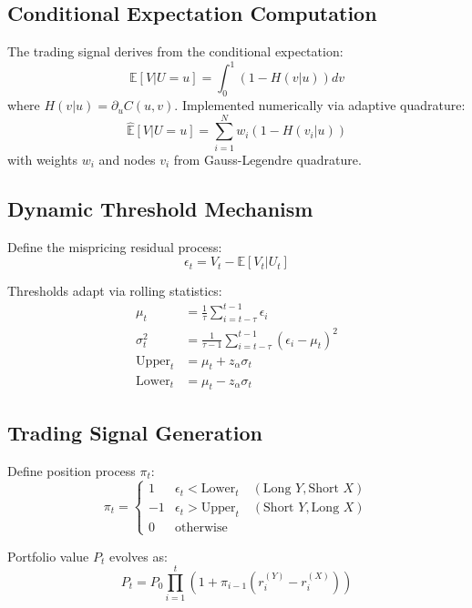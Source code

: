 \subsection{Conditional Expectation Computation}
The trading signal derives from the conditional expectation:
\begin{equation}
    \mathbb{E}[V|U=u] = \int_0^1 (1 - H(v|u))dv
\end{equation}
where $H(v|u)=\partial_u C(u,v)$. Implemented numerically via adaptive quadrature:
\begin{equation}
    \hat{\mathbb{E}}[V|U=u] = \sum_{i=1}^N w_i(1 - H(v_i|u))
\end{equation}
with weights $w_i$ and nodes $v_i$ from Gauss-Legendre quadrature.

\subsection{Dynamic Threshold Mechanism}
Define the mispricing residual process:
\begin{equation}
    \epsilon_t = V_t - \mathbb{E}[V_t|U_t]
\end{equation}

Thresholds adapt via rolling statistics:
\begin{align}
    \mu_t &= \frac{1}{\tau}\sum_{i=t-\tau}^{t-1} \epsilon_i \\
    \sigma_t^2 &= \frac{1}{\tau-1}\sum_{i=t-\tau}^{t-1} (\epsilon_i - \mu_t)^2 \\
    \text{Upper}_t &= \mu_t + z_\alpha\sigma_t \\
    \text{Lower}_t &= \mu_t - z_\alpha\sigma_t
\end{align}

\subsection{Trading Signal Generation}
Define position process $\pi_t$:
\begin{equation}
    \pi_t = \begin{cases}
        1 & \epsilon_t < \text{Lower}_t \quad (\text{Long }Y, \text{Short }X) \\
        -1 & \epsilon_t > \text{Upper}_t \quad (\text{Short }Y, \text{Long }X) \\
        0 & \text{otherwise}
    \end{cases}
\end{equation}

Portfolio value $P_t$ evolves as:
\begin{equation}
    P_t = P_0 \prod_{i=1}^t \left(1 + \pi_{i-1}\left(r_i^{(Y)} - r_i^{(X)}\right)\right)
\end{equation}

